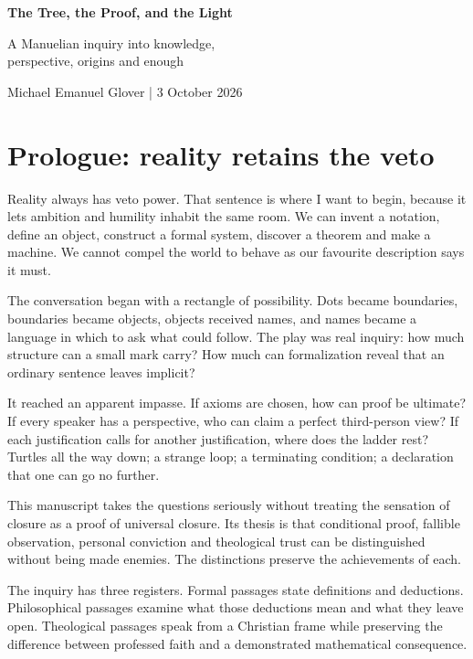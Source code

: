 \documentclass[10pt]{article}
\begin{document}
\begin{center}
{\LARGE\bfseries\color{ink}The Tree, the Proof, and the Light}\par\vspace{10pt}
{\large\color{blue}A Manuelian inquiry into knowledge,\\perspective, origins and enough}\par\vspace{10pt}
Michael Emanuel Glover | 3 October 2026
\end{center}

\section*{Prologue: reality retains the veto}
Reality always has veto power. That sentence is where I want to begin, because it lets ambition and humility inhabit the same room. We can invent a notation, define an object, construct a formal system, discover a theorem and make a machine. We cannot compel the world to behave as our favourite description says it must.

The conversation began with a rectangle of possibility. Dots became boundaries, boundaries became objects, objects received names, and names became a language in which to ask what could follow. The play was real inquiry: how much structure can a small mark carry? How much can formalization reveal that an ordinary sentence leaves implicit?

It reached an apparent impasse. If axioms are chosen, how can proof be ultimate? If every speaker has a perspective, who can claim a perfect third-person view? If each justification calls for another justification, where does the ladder rest? Turtles all the way down; a strange loop; a terminating condition; a declaration that one can go no further.

This manuscript takes the questions seriously without treating the sensation of closure as a proof of universal closure. Its thesis is that conditional proof, fallible observation, personal conviction and theological trust can be distinguished without being made enemies. The distinctions preserve the achievements of each.

The inquiry has three registers. Formal passages state definitions and deductions. Philosophical passages examine what those deductions mean and what they leave open. Theological passages speak from a Christian frame while preserving the difference between professed faith and a demonstrated mathematical consequence.
\end{document}
